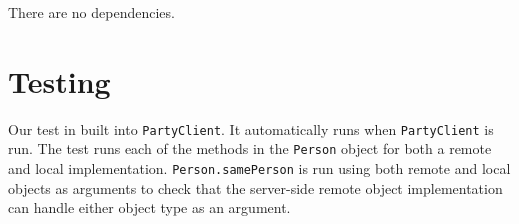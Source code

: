 \documentclass[12pt]{article}
\begin{document}
There are no dependencies.


\section{Testing}

Our test in built into \texttt{PartyClient}. It automatically runs when \texttt{PartyClient} is run. The test runs each of the methods in the \texttt{Person} object for both a remote and local implementation. \texttt{Person.samePerson} is run using both remote and local objects as arguments to check that the server-side remote object implementation can handle either object type as an argument.
\end{document}
